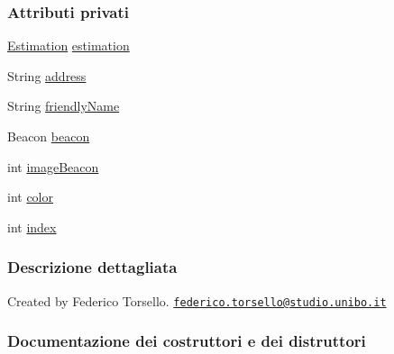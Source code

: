 \subsubsection*{Attributi privati}
\begin{DoxyCompactItemize}
\item 
\hyperlink{classit_1_1unibo_1_1torsello_1_1bluetoothpositioning_1_1distanceEstimation_1_1Estimation}{Estimation} \hyperlink{classit_1_1unibo_1_1torsello_1_1bluetoothpositioning_1_1model_1_1Device_ac619c42728cd40f41a5f12fde56b4425_ac619c42728cd40f41a5f12fde56b4425}{estimation}
\item 
String \hyperlink{classit_1_1unibo_1_1torsello_1_1bluetoothpositioning_1_1model_1_1Device_a0abcf7e0df4ccc96e487c6f9b90b4e13_a0abcf7e0df4ccc96e487c6f9b90b4e13}{address}
\item 
String \hyperlink{classit_1_1unibo_1_1torsello_1_1bluetoothpositioning_1_1model_1_1Device_aa9a540b316c9de7f9b3a94f58570f6d3_aa9a540b316c9de7f9b3a94f58570f6d3}{friendly\+Name}
\item 
Beacon \hyperlink{classit_1_1unibo_1_1torsello_1_1bluetoothpositioning_1_1model_1_1Device_ad5ffce680eb2eb38fc6bb8aee234f155_ad5ffce680eb2eb38fc6bb8aee234f155}{beacon}
\item 
int \hyperlink{classit_1_1unibo_1_1torsello_1_1bluetoothpositioning_1_1model_1_1Device_a2faee0d51162a4efebfc2db787901019_a2faee0d51162a4efebfc2db787901019}{image\+Beacon}
\item 
int \hyperlink{classit_1_1unibo_1_1torsello_1_1bluetoothpositioning_1_1model_1_1Device_aaba1f93e2a0f88f01262cb38a65489e6_aaba1f93e2a0f88f01262cb38a65489e6}{color}
\item 
int \hyperlink{classit_1_1unibo_1_1torsello_1_1bluetoothpositioning_1_1model_1_1Device_a55a01164b2388451f5e8344bfbc61ccc_a55a01164b2388451f5e8344bfbc61ccc}{index}
\end{DoxyCompactItemize}


\subsubsection{Descrizione dettagliata}
Created by Federico Torsello. \href{mailto:federico.torsello@studio.unibo.it}{\tt federico.\+torsello@studio.\+unibo.\+it} 

\subsubsection{Documentazione dei costruttori e dei distruttori}
\hypertarget{classit_1_1unibo_1_1torsello_1_1bluetoothpositioning_1_1model_1_1Device_a2617f025dd33e0cae4adb3323245f865_a2617f025dd33e0cae4adb3323245f865}{}\label{classit_1_1unibo_1_1torsello_1_1bluetoothpositioning_1_1model_1_1Device_a2617f025dd33e0cae4adb3323245f865_a2617f025dd33e0cae4adb3323245f865} 
